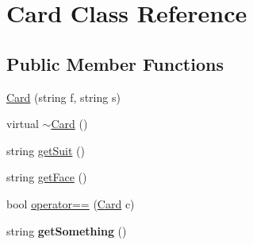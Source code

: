 \hypertarget{class_card}{\section{Card Class Reference}
\label{class_card}
}
\subsection*{Public Member Functions}
\begin{DoxyCompactItemize}
\item 
\hyperlink{class_card_ac116b6ce69235c84afb8740b162d665a}{Card} (string f, string s)
\item 
virtual \hyperlink{class_card_a2b09fd7321b238b45b2ad2f034760e5d}{$\sim$\-Card} ()
\item 
string \hyperlink{class_card_a6bda7d706eb87b009c94ae2a9654f6d9}{get\-Suit} ()
\item 
string \hyperlink{class_card_afb2b73b451cc753663edab09abfc4bd6}{get\-Face} ()
\item 
bool \hyperlink{class_card_ac1217b730fc4f164ca1d0aa4b0c2bd6e}{operator==} (\hyperlink{class_card}{Card} c)
\item 
\hypertarget{class_card_a6d2c2c6fb324cf5d8ac3f2caa76a3666}{string {\bfseries get\-Something} ()}\label{class_card_a6d2c2c6fb324cf5d8ac3f2caa76a3666}

\end{DoxyCompactItemize}



